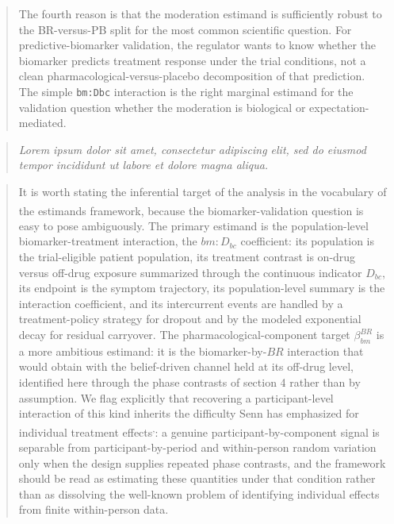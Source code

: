 \documentclass[
  11pt,
]{article}
\newenvironment{rgt}{%
  \begin{quote}\small\itshape\color[RGB]{20,60,160}}{%
  \end{quote}}
\newenvironment{orig}{%
  \begin{quote}\normalsize\color[gray]{0.55}}{%
  \end{quote}}
\begin{document}
\begin{orig}
The fourth reason is that the moderation estimand is
sufficiently robust to the BR-versus-PB split for the most
common scientific question. For predictive-biomarker validation,
the regulator wants to know whether the biomarker predicts
treatment response under the trial conditions, not a clean
pharmacological-versus-placebo decomposition of that prediction.
The simple \texttt{bm:Dbc} interaction is the right marginal
estimand for the validation question whether the moderation is
biological or expectation-mediated.

\end{orig}

\begin{rgt}
Lorem ipsum dolor sit amet, consectetur adipiscing elit, sed do eiusmod tempor incididunt ut labore et dolore magna aliqua.

\end{rgt}

\begin{orig}
It is worth stating the inferential target of the analysis in
the vocabulary of the estimands framework\textsuperscript{}, because
the biomarker-validation question is easy to pose ambiguously.
The primary estimand is the population-level
biomarker-treatment interaction, the \(bm{:}D_{bc}\)
coefficient: its population is the trial-eligible patient
population, its treatment contrast is on-drug versus off-drug
exposure summarized through the continuous indicator \(D_{bc}\),
its endpoint is the symptom trajectory, its population-level
summary is the interaction coefficient, and its intercurrent
events are handled by a treatment-policy strategy for dropout and
by the modeled exponential decay for residual carryover. The
pharmacological-component target \(\beta_{bm}^{BR}\) is a more
ambitious estimand: it is the biomarker-by-\(BR\) interaction that
would obtain with the belief-driven channel held at its off-drug
level, identified here through the phase contrasts of section 4
rather than by assumption. We flag explicitly that recovering a
participant-level interaction of this kind inherits the
difficulty Senn has emphasized for individual treatment effects\textsuperscript{,}: a genuine participant-by-component signal
is separable from participant-by-period and within-person random
variation only when the design supplies repeated phase contrasts,
and the framework should be read as estimating these quantities
under that condition rather than as dissolving the well-known
problem of identifying individual effects from finite
within-person data.

\end{orig}
\end{document}
